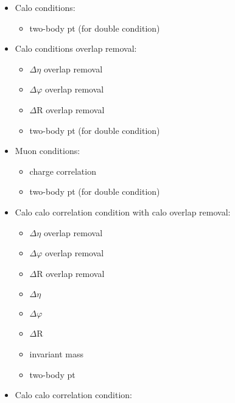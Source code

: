 \begin{itemize}
\item Calo conditions:
\begin{itemize}
\item two-body pt (for double condition)
\end{itemize}
\item Calo conditions overlap removal:
\begin{itemize}
\item $\Delta\eta$ overlap removal
\item $\Delta\varphi$ overlap removal
\item $\Delta$R overlap removal
\item two-body pt (for double condition)
\end{itemize}
\item Muon conditions:
\begin{itemize}
\item charge correlation
\item two-body pt (for double condition)
\end{itemize}
\item Calo calo correlation condition with calo overlap removal:
\begin{itemize}
\item $\Delta\eta$ overlap removal
\item $\Delta\varphi$ overlap removal
\item $\Delta$R overlap removal
\item $\Delta\eta$
\item $\Delta\varphi$
\item $\Delta$R
\item invariant mass
\item two-body pt
\end{itemize}
\item Calo calo correlation condition:
\begin{itemize}

\end{itemize}
\end{itemize}
